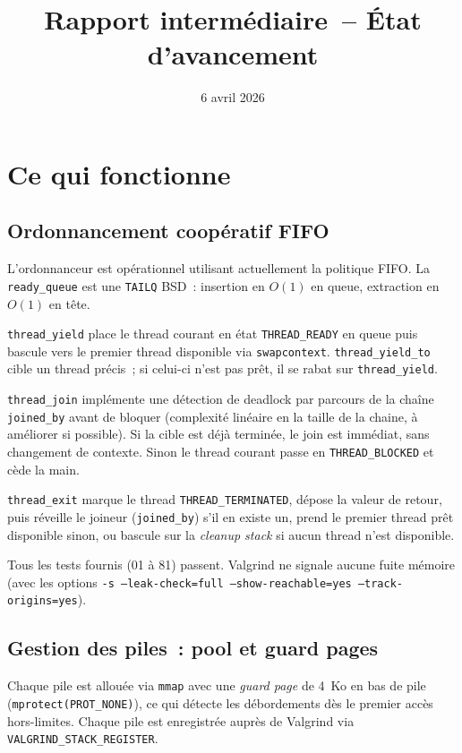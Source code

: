 \documentclass[11pt,a4paper]{article}
\title{Rapport interm\'ediaire~-- \'Etat d'avancement}
\author{}
\date{6 avril 2026}
\begin{document}
\maketitle

\section{Ce qui fonctionne}

\subsection{Ordonnancement coop\'eratif FIFO}

L'ordonnanceur est op\'erationnel utilisant actuellement la politique FIFO. La \texttt{ready\_queue} est une
\texttt{TAILQ} BSD~: insertion en $O(1)$ en queue, extraction en $O(1)$ en t\^ete.

\texttt{thread\_yield} place le thread courant en \'etat \texttt{THREAD\_READY}
en queue puis bascule vers le premier thread disponible via \texttt{swapcontext}.
\texttt{thread\_yield\_to} cible un thread pr\'ecis~; si celui-ci n'est pas pr\^et,
il se rabat sur \texttt{thread\_yield}.

\texttt{thread\_join} impl\'emente une d\'etection de deadlock par parcours de la
cha\^ine \texttt{joined\_by} avant de bloquer (complexité linéaire en la taille de la chaine, à améliorer si possible). Si la cible est d\'ej\`a termin\'ee,
le join est imm\'ediat, sans changement de contexte. Sinon le thread courant passe
en \texttt{THREAD\_BLOCKED} et c\`ede la main.

\texttt{thread\_exit} marque le thread \texttt{THREAD\_TERMINATED}, d\'epose la
valeur de retour, puis r\'eveille le joineur (\texttt{joined\_by}) s'il en existe
un, prend le premier thread pr\^et disponible sinon, ou bascule sur la
\textit{cleanup stack} si aucun thread n'est disponible.

Tous les tests fournis (01 \`a 81) passent. Valgrind ne signale aucune fuite
m\'emoire (avec les options \texttt{-s --leak-check=full --show-reachable=yes --track-origins=yes}).

\subsection{Gestion des piles~: pool et guard pages}

Chaque pile est allou\'ee via \texttt{mmap} avec une \textit{guard page} de 4~Ko
en bas de pile (\texttt{mprotect(PROT\_NONE)}), ce qui d\'etecte les d\'ebordements
d\`es le premier acc\`es hors-limites. Chaque pile est enregistr\'ee aupr\`es de
Valgrind via \texttt{VALGRIND\_STACK\_REGISTER}.
\end{document}
